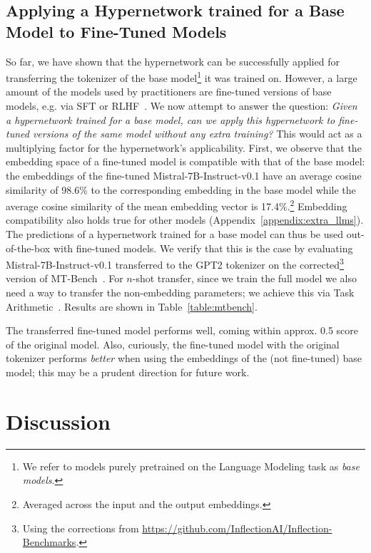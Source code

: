 \documentclass{article}
\begin{document}
\subsection{Applying a Hypernetwork trained for a Base Model to Fine-Tuned Models}
\label{subsec:ft}



So far, we have shown that the hypernetwork can be successfully applied for transferring the tokenizer of the base model\footnote{We refer to models purely pretrained on the Language Modeling task as \textit{base models}.} it was trained on. However, a large amount of the models used by practitioners are fine-tuned versions of base models, e.g. via SFT or RLHF~\citep{ouyang2022training}. We now attempt to answer the question: \textit{Given a hypernetwork trained for a base model, can we apply this hypernetwork to fine-tuned versions of the same model without any extra training?} This would act as a multiplying factor for the hypernetwork's applicability. First, we observe that the embedding space of a fine-tuned model is compatible with that of the base model: the embeddings of the fine-tuned
Mistral-7B-Instruct-v0.1 have an average cosine similarity of 98.6\% to the corresponding embedding in the base model while the average cosine similarity of the mean embedding vector is 17.4\%.\footnote{Averaged across the input and the output embeddings.} Embedding compatibility also holds true for other models (Appendix~\ref{appendix:extra_llms}). The predictions of a hypernetwork trained for a base model can thus be used out-of-the-box with fine-tuned models. We verify that this is the case by evaluating
Mistral-7B-Instruct-v0.1 transferred to the GPT2 tokenizer on the corrected\footnote{Using the corrections from \url{https://github.com/InflectionAI/Inflection-Benchmarks}.} version of MT-Bench~\citep{zheng2023judging}. For $n$-shot transfer, since we train the full model we also need a way to transfer the non-embedding parameters; we achieve this via Task Arithmetic~\citep{ilharco2023editing}. Results are shown in Table~\ref{table:mtbench}.

The transferred fine-tuned model performs well, coming within approx. 0.5 score of the original model. Also, curiously, the fine-tuned model with the original tokenizer performs \textit{better} when using the embeddings of the (not fine-tuned) base model; this may be a prudent direction for future work.

\section{Discussion}
\label{sec:discussion}
\end{document}

